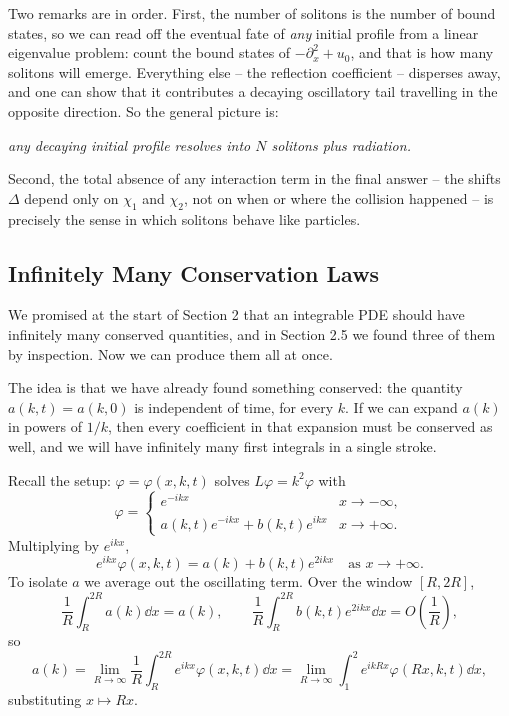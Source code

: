 \documentclass[a4paper]{scrartcl}
\begin{document}
Two remarks are in order. First, the number of solitons is the number of bound states, so we can read off the eventual fate of \emph{any} initial profile from a linear eigenvalue problem: count the bound states of $-\partial_x^2 + u_0$, and that is how many solitons will emerge. Everything else -- the reflection coefficient -- disperses away, and one can show that it contributes a decaying oscillatory tail travelling in the opposite direction. So the general picture is:
\begin{center}
	\emph{any decaying initial profile resolves into $N$ solitons plus radiation.}
\end{center}
Second, the total absence of any interaction term in the final answer -- the shifts $\Delta$ depend only on $\chi_1$ and $\chi_2$, not on when or where the collision happened -- is precisely the sense in which solitons behave like particles.

\subsection{Infinitely Many Conservation Laws}

We promised at the start of Section 2 that an integrable PDE should have infinitely many conserved quantities, and in Section 2.5 we found three of them by inspection. Now we can produce them all at once.

The idea is that we have already found something conserved: the quantity $a(k,t) = a(k,0)$ is independent of time, for every $k$. If we can expand $a(k)$ in powers of $1/k$, then every coefficient in that expansion must be conserved as well, and we will have infinitely many first integrals in a single stroke.

Recall the setup: $\varphi = \varphi(x,k,t)$ solves $L\varphi = k^2\varphi$ with
$$
\varphi = \begin{cases}e^{-ikx} & x\to-\infty,\\ a(k,t)e^{-ikx} + b(k,t)e^{ikx} & x\to+\infty.\end{cases}
$$
Multiplying by $e^{ikx}$,
$$
e^{ikx}\varphi(x,k,t) = a(k) + b(k,t)e^{2ikx}\quad\text{as }x\to+\infty.
$$
To isolate $a$ we average out the oscillating term. Over the window $[R, 2R]$,
$$
\frac{1}{R}\int_R^{2R}a(k)\dd x = a(k), \qquad \frac{1}{R}\int_R^{2R}b(k,t)e^{2ikx}\dd x = O\!\left(\frac{1}{R}\right),
$$
so
$$
a(k) = \lim_{R\to\infty}\frac{1}{R}\int_R^{2R}e^{ikx}\varphi(x,k,t)\dd x = \lim_{R\to\infty}\int_1^2e^{ikRx}\varphi(Rx,k,t)\dd x,
$$
substituting $x\mapsto Rx$.
\end{document}
